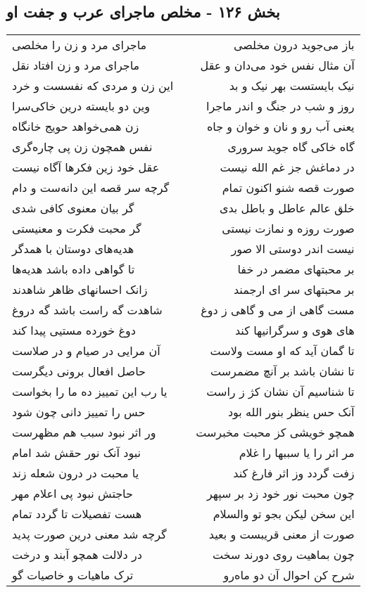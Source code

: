 \begin{center}
\section*{بخش ۱۲۶ - مخلص ماجرای عرب و جفت او}
\label{sec:sh126}
\begin{longtable}{l p{0.5cm} r}
ماجرای مرد و زن را مخلصی
&&
باز می‌جوید درون مخلصی
\\
ماجرای مرد و زن افتاد نقل
&&
آن مثال نفس خود می‌دان و عقل
\\
این زن و مردی که نفسست و خرد
&&
نیک بایستست بهر نیک و بد
\\
وین دو بایسته درین خاکی‌سرا
&&
روز و شب در جنگ و اندر ماجرا
\\
زن همی‌خواهد حویج خانگاه
&&
یعنی آب رو و نان و خوان و جاه
\\
نفس همچون زن پی چاره‌گری
&&
گاه خاکی گاه جوید سروری
\\
عقل خود زین فکرها آگاه نیست
&&
در دماغش جز غم الله نیست
\\
گرچه سر قصه این دانه‌ست و دام
&&
صورت قصه شنو اکنون تمام
\\
گر بیان معنوی کافی شدی
&&
خلق عالم عاطل و باطل بدی
\\
گر محبت فکرت و معنیستی
&&
صورت روزه و نمازت نیستی
\\
هدیه‌های دوستان با همدگر
&&
نیست اندر دوستی الا صور
\\
تا گواهی داده باشد هدیه‌ها
&&
بر محبتهای مضمر در خفا
\\
زانک احسانهای ظاهر شاهدند
&&
بر محبتهای سر ای ارجمند
\\
شاهدت گه راست باشد گه دروغ
&&
مست گاهی از می و گاهی ز دوغ
\\
دوغ خورده مستیی پیدا کند
&&
های هوی و سرگرانیها کند
\\
آن مرایی در صیام و در صلاست
&&
تا گمان آید که او مست ولاست
\\
حاصل افعال برونی دیگرست
&&
تا نشان باشد بر آنچ مضمرست
\\
یا رب این تمییز ده ما را بخواست
&&
تا شناسیم آن نشان کژ ز راست
\\
حس را تمییز دانی چون شود
&&
آنک حس ینظر بنور الله بود
\\
ور اثر نبود سبب هم مظهرست
&&
همچو خویشی کز محبت مخبرست
\\
نبود آنک نور حقش شد امام
&&
مر اثر را یا سببها را غلام
\\
یا محبت در درون شعله زند
&&
زفت گردد وز اثر فارغ کند
\\
حاجتش نبود پی اعلام مهر
&&
چون محبت نور خود زد بر سپهر
\\
هست تفصیلات تا گردد تمام
&&
این سخن لیکن بجو تو والسلام
\\
گرچه شد معنی درین صورت پدید
&&
صورت از معنی قریبست و بعید
\\
در دلالت همچو آبند و درخت
&&
چون بماهیت روی دورند سخت
\\
ترک ماهیات و خاصیات گو
&&
شرح کن احوال آن دو ماه‌رو
\\
\end{longtable}
\end{center}
